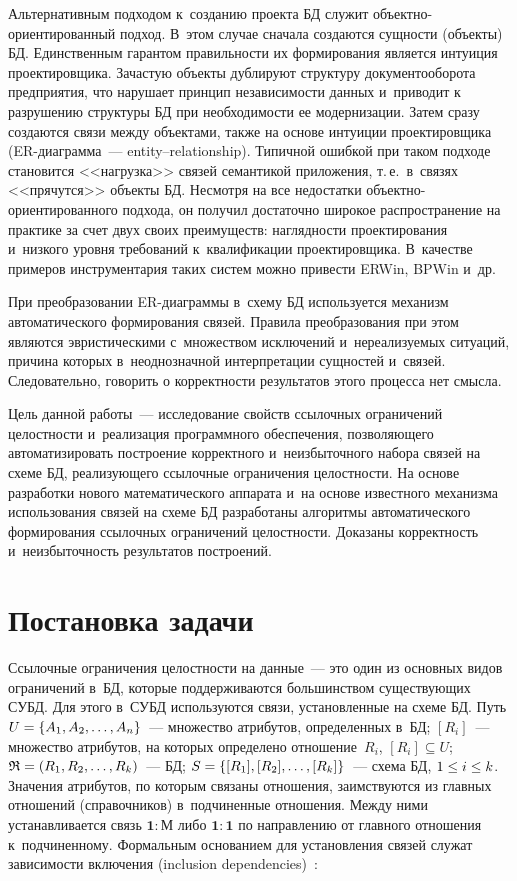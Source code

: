 \begin{multicols}{2}
Альтернативным
подходом к~со\-зда\-нию проекта БД служит объект\-но-ори\-ен\-ти\-ро\-ван\-ный подход.
В~этом случае сначала создаются сущности (объекты) БД. Единственным
гарантом правильности их формирования является интуиция проектировщика.
Зачастую объекты дублируют структуру документооборота предприятия, что
нарушает принцип независимости данных и~приводит к разрушению структуры
БД при необходимости ее модернизации. Затем сразу создаются связи между
объектами, также на основе интуиции проектировщика (ER-диа\-грам\-ма~---
entity--relationship).
Типичной ошибкой при таком подходе становится <<нагрузка>> связей
семантикой приложения, т.\,е.\ в~связях <<прячутся>> объекты БД. Несмотря
на все недостатки объ\-ект\-но-ори\-ен\-ти\-ро\-ван\-но\-го подхода, он получил
достаточно широкое распространение на практике за счет двух своих
преимуществ: наглядности проектирования и~низкого уровня требований 
к~квалификации проектировщика. В~качестве примеров инструментария таких
систем можно привести ERWin, BPWin и~др.

  При преобразовании ER-диа\-грам\-мы в~схему БД используется механизм
автоматического формирования связей. Правила преобразования при этом
являются эвристическими с~множеством исключений и~нереализуемых
ситуаций, причина которых в~неоднозначной интерпретации сущностей и~связей. Следовательно, говорить о корректности результатов этого процесса нет
смысла.

  Цель данной работы~--- исследование свойств ссылочных ограничений
целостности и~реализация программного обеспечения, позволяющего
автоматизировать построение корректного и~неизбыточного набора связей на
схеме БД, реализующего ссылочные ограничения целостности. На основе
разработки нового математического аппарата и~на основе известного механизма
использования связей на схеме БД разработаны алгоритмы автоматического
формирования ссылочных ограничений целостности. Доказаны корректность и~неизбыточность результатов построений.

\section{Постановка задачи}

  Ссылочные ограничения целостности на данные~--- это один из основных
видов ограничений в~БД, которые поддерживаются большинством
существующих СУБД. Для этого в~СУБД используются связи, установленные
на схеме БД. Путь $U\hm= \{ A_1, A_2,\ldots , A_n\}$~--- множество атрибутов,
определенных в~БД; $[R_i]$~--- множество атрибутов, на которых
определено отношение~$R_i$, $[R_i]\subseteq U$; $\mathfrak{R}\hm= (R_1,
R_2, \ldots , R_k)$~--- БД; $S\hm= \{ [R_1], [R_2], \ldots , [R_k]\}$~---
схема БД, $1\hm\leq i\hm\leq k$. Значения атрибутов, по которым связаны отношения,
заимствуются из главных отношений (справочников) в~подчиненные
отношения. Между ними устанавливается связь $\mathbf{1}:\mathbf{М}$ либо
$\mathbf{1}:\mathbf{1}$ по направлению от главного отношения
к~подчиненному. Формальным основанием для установления связей служат
зависимости включения (inclusion dependencies)~\cite{5-z}:


\end{multicols}
